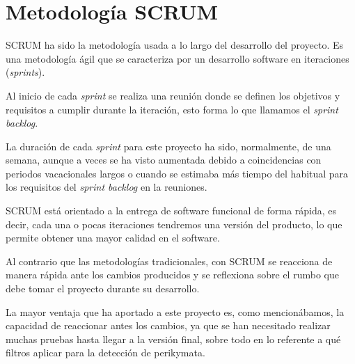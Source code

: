
\begin{comment}
Esta parte de la memoria tiene como objetivo presentar las técnicas metodológicas y las herramientas de desarrollo que se han utilizado para llevar a cabo el proyecto. Si se han estudiado diferentes alternativas de metodologías, herramientas, bibliotecas se puede hacer un resumen de los aspectos más destacados de cada alternativa, incluyendo comparativas entre las distintas opciones y una justificación de las elecciones realizadas. 
No se pretende que este apartado se convierta en un capítulo de un libro dedicado a cada una de las alternativas, sino comentar los aspectos más destacados de cada opción, con un repaso somero a los fundamentos esenciales y referencias bibliográficas para que el lector pueda ampliar su conocimiento sobre el tema.
\end{comment}

\section{Metodología SCRUM}
SCRUM ha sido la metodología usada a lo largo del desarrollo del proyecto. Es una metodología ágil que se caracteriza por un desarrollo software en iteraciones (\textit{sprints}). 

Al inicio de cada \textit{sprint} se realiza una reunión donde se definen los objetivos y requisitos a cumplir durante la iteración, esto forma lo que llamamos el \textit{sprint backlog}. 

La duración de cada \textit{sprint} para este proyecto ha sido, normalmente, de una semana, aunque a veces se ha visto aumentada debido a coincidencias con periodos vacacionales largos o cuando se estimaba más tiempo del habitual para los requisitos del \textit{sprint backlog} en la reuniones.

SCRUM está orientado a la entrega de software funcional de forma rápida, es decir, cada una o pocas iteraciones tendremos una versión del producto, lo que permite obtener una mayor calidad en el software. 

Al contrario que las metodologías tradicionales, con SCRUM se reacciona de manera rápida ante los cambios producidos y se reflexiona sobre el rumbo que debe tomar el proyecto durante su desarrollo.

La mayor ventaja que ha aportado a este proyecto es, como mencionábamos, la capacidad de reaccionar antes los cambios, ya que se han necesitado realizar muchas pruebas hasta llegar a la versión final, sobre todo en lo referente a qué filtros aplicar para la detección de perikymata. 

